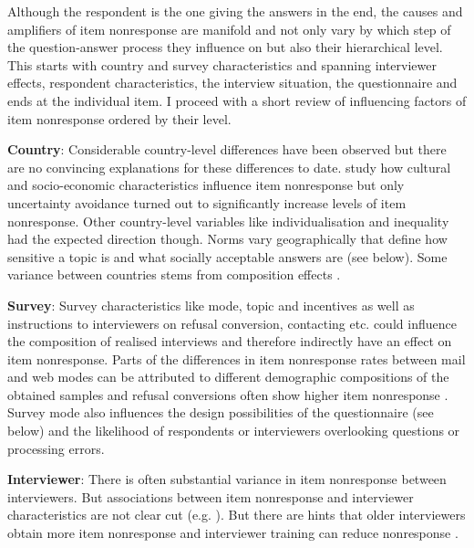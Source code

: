 \documentclass[a4paper,12pt]{article}
\begin{document}
Although the respondent is the one giving the answers in the end, the causes and amplifiers of item nonresponse are manifold and not only vary by which step of the question-answer process they influence \citep{holbrookImpactQuestionRespondent2006} on but also their hierarchical level. This starts with country and survey characteristics and spanning interviewer effects, respondent characteristics, the interview situation, the questionnaire and ends at the individual item. I proceed with a short review of influencing factors of item nonresponse ordered by their level.

\bigskip

\textbf{Country}:
Considerable country-level differences have been observed but there are no convincing explanations for these differences to date. \citet{meitingerPowerCultureItem2020} study how cultural and socio-economic characteristics influence item nonresponse but only uncertainty avoidance turned out to significantly increase levels of item nonresponse. Other country-level variables like individualisation and inequality had the expected direction though. Norms vary geographically that define how sensitive a topic is and what socially acceptable answers are (see below). Some variance between countries stems from composition effects \citep{kochItemNonresponseEuropean2009}.

\textbf{Survey}:
Survey characteristics like mode, topic and incentives as well as instructions to interviewers on refusal conversion, contacting etc. could influence the composition of realised interviews and therefore indirectly have an effect on item nonresponse. Parts of the differences in item nonresponse rates between mail and web modes can be attributed to different demographic compositions of the obtained samples \citep{messerDeterminantsItemNonresponse2012} and refusal conversions often show higher item nonresponse \citep{yanRelationUnitNonresponse2010}. Survey mode also influences the design possibilities of the questionnaire (see below) and the likelihood of respondents or interviewers overlooking questions or processing errors.

\textbf{Interviewer}:
There is often substantial variance in item nonresponse between interviewers. But associations between item nonresponse and interviewer characteristics are not clear cut (e.g. \cite{pickeryImpactRespondentInterviewer1998, pickeryExplorationQuestionCharacteristics2001, silberEffectsQuestionRespondent2021}). But there are hints that older interviewers obtain more item nonresponse and interviewer training can reduce nonresponse \citep{silberEffectsQuestionRespondent2021}.
\end{document}
